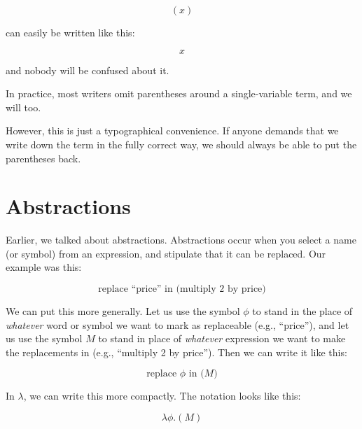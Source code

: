 \documentclass{book}
\numberwithin{equation}{chapter}
\begin{document}
\begin{equation}
(x)
\end{equation}

\noindent
can easily be written like this:

\begin{equation}
x
\end{equation}

\noindent
and nobody will be confused about it.

In practice, most writers omit parentheses around a single-variable term, and we will too. 

However, this is just a typographical convenience. If anyone demands that we write down the term in the fully correct way, we should always be able to put the parentheses back.


\chapter{Abstractions}

Earlier, we talked about abstractions. Abstractions occur when you select a name (or symbol) from an expression, and stipulate that it can be replaced. Our example was this:

\begin{equation}
\text{replace ``price'' in (multiply 2 by price)}
\end{equation}

\noindent
We can put this more generally. Let us use the symbol $\phi$ to stand in the place of \textit{whatever} word or symbol we want to mark as replaceable (e.g., ``price''), and let us use the symbol $M$ to stand in place of \textit{whatever} expression we want to make the replacements in (e.g., ``multiply 2 by price''). Then we can write it like this:

\begin{equation}
\text{replace $\phi$ in ($M$)}
\end{equation}

\noindent
In $\lambda$, we can write this more compactly. The notation looks like this:

\begin{equation}
\lambda \phi . (M)
\end{equation}
\end{document}
